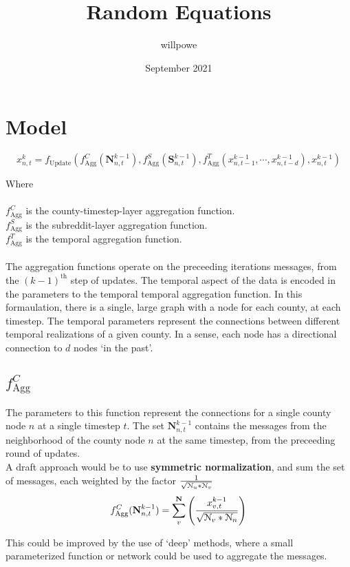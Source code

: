 \documentclass{article}
\title{Random Equations}
\author{willpowe}
\date{September 2021}
\begin{document}
\section{Model}


\begin{equation}
x_{n,t}^k= f_{\text{Update}}(
						f_{\text{Agg}}^C(\textbf{N}_{n,t}^{k-1}),
						f_{\text{Agg}}^S(\textbf{S}_{n,t}^{k-1}),
						f_{\text{Agg}}^T(x_{n,t-1}^{k-1}, \cdots, x_{n, t-d}^{k-1}), 
						x_{n, t}^{k-1})
\end{equation}

Where \\
\\
$f_{\text{Agg}}^C$ is the county-timestep-layer aggregation function. \\
$f_{\text{Agg}}^S$ is the subreddit-layer aggregation function. \\
$f_{\text{Agg}}^T$ is the temporal aggregation function.  \\
\\
The aggregation functions operate on the preceeding iterations messages, from the $(k-1)^\text{th}$ step of updates. The temporal aspect of the data is encoded in the parameters to the temporal temporal aggregation function. In this formaulation, there is a single, large graph with a node for each county, at each timestep. The temporal parameters represent the connections between different temporal realizations of a given county. In a sense, each node has a directional connection to $d$ nodes `in the past'.

\subsection{$f_{\text{Agg}}^C$}
The parameters to this function represent the connections for a single county node $n$ at a single timestep $t$. The set $\textbf{N}_{n,t}^{k-1}$ contains the messages from the neighborhood of the county node $n$ at the same timestep, from the preceeding round of updates. 
\\
A draft approach would be to use \textbf{symmetric normalization}, and sum the set of messages, each weighted by the factor $\frac{1}{\sqrt{\EuScript{N}_u*\EuScript{N}_v}}$\\

$$f_{\text{Agg}}^C(\textbf{N}_{n,t}^{k-1})=\sum_v^{\textbf{N}}\left( \frac{x_{v,t}^{k-1}}{\sqrt{\EuScript{N}_v*\EuScript{N}_n}} \right)$$

This could be improved by the use of `deep' methods, where a small parameterized function or network could be used to aggregate the messages. 
\end{document}
